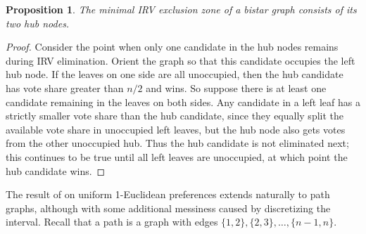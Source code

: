 \documentclass{article}
\theoremstyle{theorem}
\newtheorem{proposition}{Proposition}
\theoremstyle{definition}
\begin{document}
\begin{proposition}
  The minimal IRV exclusion zone of a bistar graph consists of its two hub nodes.
\end{proposition}
\begin{proof}
Consider the point when only one candidate in the hub nodes remains during IRV elimination. Orient the graph so that this candidate occupies the left hub node. If the leaves on one side are all unoccupied, then the hub candidate has vote share greater than $n/2$ and wins. So suppose there is at least one candidate remaining in the leaves on both sides. Any candidate in a left leaf has a strictly smaller vote share than the hub candidate, since they equally split the available vote share in unoccupied left leaves, but the hub node also gets votes from the other unoccupied hub. Thus the hub candidate is not eliminated next; this continues to be true until all left leaves are unoccupied, at which point the hub candidate wins.  
\end{proof}

The result of \citet{tomlinson2024moderating} on uniform 1-Euclidean preferences extends naturally to path graphs, although with some additional messiness caused by discretizing the interval. Recall that a path is a graph with edges $\{1, 2\}, \{2, 3\}, \dots, \{n-1, n\}$.
\end{document}
